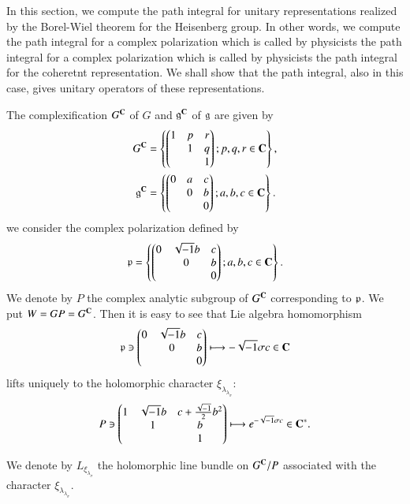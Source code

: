 In this section, we compute the path integral for unitary representations realized by the Borel-Wiel theorem for the Heisenberg group. In other words, we compute the path integral for a complex polarization which is called by physicists the path integral for a complex polarization which is called by physicists the path integral for the coheretnt representation. We shall show that the path integral, also in this case, gives unitary operators of these representations.

The complexification $G^{\mathbf{C}}$ of $G$ and $\mathfrak{g}^{\mathbf{C}}$ of $\mathfrak{g}$ are given by
\begin{align*}
G^{\mathbf{C}} &=\left\{ \begin{pmatrix}
1 & p & r\\
  &  1 & q\\
  &    & 1
\end{pmatrix}
; p,q,r \in \mathbf{C} \right\},\\
\mathfrak{g}^{\mathbf{C}} &=\left\{ \begin{pmatrix}
0 & a & c\\
  &  0 & b\\
  &    & 0
\end{pmatrix}
; a,b,c \in \mathbf{C} \right\}.
\end{align*}
we consider the complex polarization defined by
$$
\mathfrak{p} =\left\{ \begin{pmatrix}
0 & \sqrt{-1}b & c\\
  &  0 & b\\
  &    & 0
\end{pmatrix}
; a,b,c \in \mathbf{C} \right\}.
$$
We denote by $P$ the complex analytic subgroup of $G^{\mathbf{C}}$ corresponding to $\mathfrak{p}$. We put $W=GP=G^{\mathbf{C}}$. Then it is easy to see that Lie algebra homomorphism
$$
\mathfrak{p} \ni \begin{pmatrix}
0 & \sqrt{-1}b & c\\
  &  0 & b\\
  &    & 0
\end{pmatrix}
 \longmapsto -\sqrt{-1}\sigma c \in \mathbf{C}
$$
lifts uniquely to the holomorphic character $\xi_{\lambda_{\lambda_{\sigma}}}$:
$$
P \ni \begin{pmatrix}
1 & \sqrt{-1}b & c+\frac{\sqrt{-1}}{2}b^{2}\\
  &  1 & b\\
  &    & 1
\end{pmatrix}
 \longmapsto e^{-\sqrt{-1}\sigma c} \in \mathbf{C}^{*}.
$$

We denote by $L_{\xi_{\lambda_{\sigma}}}$ the holomorphic line bundle on $G^{\mathbf{C}}/P$ associated with the character $\xi_{\lambda_{\lambda_{\sigma}}}$.

